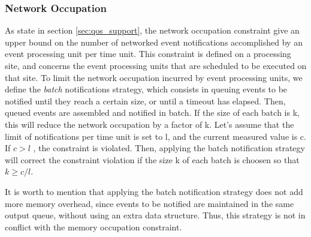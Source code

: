 \documentclass[a4paper,twoside]{article}
\begin{document}
\subsubsection{Network Occupation} 
As state in section \ref{sec:qos_support}, the network occupation constraint give an upper bound on the number of networked event notifications accomplished by an event processing unit per time unit. This constraint is defined on a processing site, and concerns the event processing units that are scheduled to be executed on that site. To limit the network occupation incurred by event processing units, we define the \textit{batch} notifications strategy, which consists in queuing events to be notified until they reach a certain size, or until a timeout has elapsed. Then, queued events are assembled and notified in batch. If the size of each batch is k, this will reduce the network occupation by a factor of k. Let's assume that the limit of notifications per time unit is set to l, and the current measured value is c. If  $c > l$ , the constraint is violated. Then, applying the batch notification strategy will correct the constraint violation if the size k of each batch is choosen so that $k \geq c/l$. 

It is worth to mention that applying the batch notification strategy does not add more memory overhead, since events to be notified are maintained in the same output queue, without using an extra data structure. Thus, this strategy is not in conflict with the memory occupation constraint.
\end{document}
